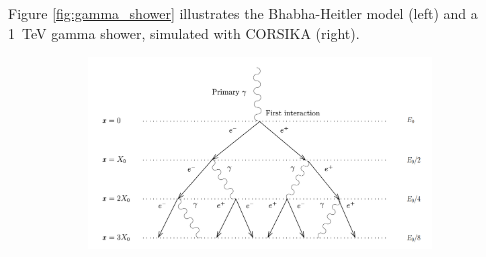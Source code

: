 Figure \ref{fig:gamma_shower} illustrates the Bhabha-Heitler model (left)
and a \SI{1}{\tera\electronvolt} gamma shower, simulated with CORSIKA (right).


\begin{figure}
	\centering
	\begin{subfigure}{.7\textwidth}
  		\centering
  		\includegraphics[width=\linewidth]{images/em_shower_illustration.png}
	\end{subfigure}%
	\begin{subfigure}{.3\textwidth}
 		\centering

\end{subfigure}
\end{figure}
